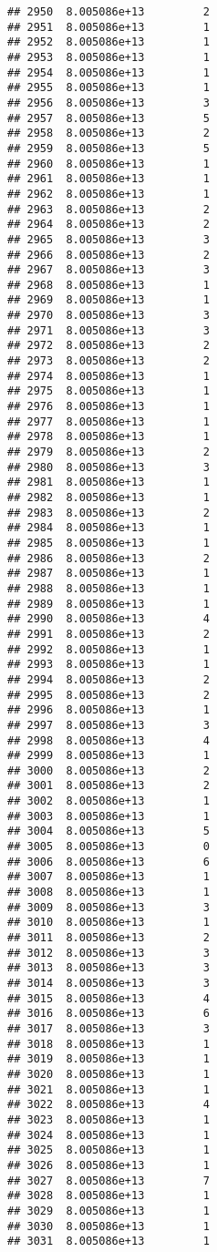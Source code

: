 \documentclass[
]{article}
\begin{document}
\begin{verbatim}
## 2950  8.005086e+13         2
## 2951  8.005086e+13         1
## 2952  8.005086e+13         1
## 2953  8.005086e+13         1
## 2954  8.005086e+13         1
## 2955  8.005086e+13         1
## 2956  8.005086e+13         3
## 2957  8.005086e+13         5
## 2958  8.005086e+13         2
## 2959  8.005086e+13         5
## 2960  8.005086e+13         1
## 2961  8.005086e+13         1
## 2962  8.005086e+13         1
## 2963  8.005086e+13         2
## 2964  8.005086e+13         2
## 2965  8.005086e+13         3
## 2966  8.005086e+13         2
## 2967  8.005086e+13         3
## 2968  8.005086e+13         1
## 2969  8.005086e+13         1
## 2970  8.005086e+13         3
## 2971  8.005086e+13         3
## 2972  8.005086e+13         2
## 2973  8.005086e+13         2
## 2974  8.005086e+13         1
## 2975  8.005086e+13         1
## 2976  8.005086e+13         1
## 2977  8.005086e+13         1
## 2978  8.005086e+13         1
## 2979  8.005086e+13         2
## 2980  8.005086e+13         3
## 2981  8.005086e+13         1
## 2982  8.005086e+13         1
## 2983  8.005086e+13         2
## 2984  8.005086e+13         1
## 2985  8.005086e+13         1
## 2986  8.005086e+13         2
## 2987  8.005086e+13         1
## 2988  8.005086e+13         1
## 2989  8.005086e+13         1
## 2990  8.005086e+13         4
## 2991  8.005086e+13         2
## 2992  8.005086e+13         1
## 2993  8.005086e+13         1
## 2994  8.005086e+13         2
## 2995  8.005086e+13         2
## 2996  8.005086e+13         1
## 2997  8.005086e+13         3
## 2998  8.005086e+13         4
## 2999  8.005086e+13         1
## 3000  8.005086e+13         2
## 3001  8.005086e+13         2
## 3002  8.005086e+13         1
## 3003  8.005086e+13         1
## 3004  8.005086e+13         5
## 3005  8.005086e+13         0
## 3006  8.005086e+13         6
## 3007  8.005086e+13         1
## 3008  8.005086e+13         1
## 3009  8.005086e+13         3
## 3010  8.005086e+13         1
## 3011  8.005086e+13         2
## 3012  8.005086e+13         3
## 3013  8.005086e+13         3
## 3014  8.005086e+13         3
## 3015  8.005086e+13         4
## 3016  8.005086e+13         6
## 3017  8.005086e+13         3
## 3018  8.005086e+13         1
## 3019  8.005086e+13         1
## 3020  8.005086e+13         1
## 3021  8.005086e+13         1
## 3022  8.005086e+13         4
## 3023  8.005086e+13         1
## 3024  8.005086e+13         1
## 3025  8.005086e+13         1
## 3026  8.005086e+13         1
## 3027  8.005086e+13         7
## 3028  8.005086e+13         1
## 3029  8.005086e+13         1
## 3030  8.005086e+13         1
## 3031  8.005086e+13         1

\end{verbatim}
\end{document}
